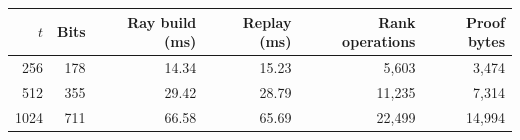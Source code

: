 \begin{tabular}{@{}rrrrrr@{}}
\toprule
$t$ & Bits & Ray build (ms) & Replay (ms) & Rank operations & Proof bytes \\
\midrule
256 & 178 & 14.34 & 15.23 & 5,603 & 3,474 \\
512 & 355 & 29.42 & 28.79 & 11,235 & 7,314 \\
1024 & 711 & 66.58 & 65.69 & 22,499 & 14,994 \\
\bottomrule
\end{tabular}

